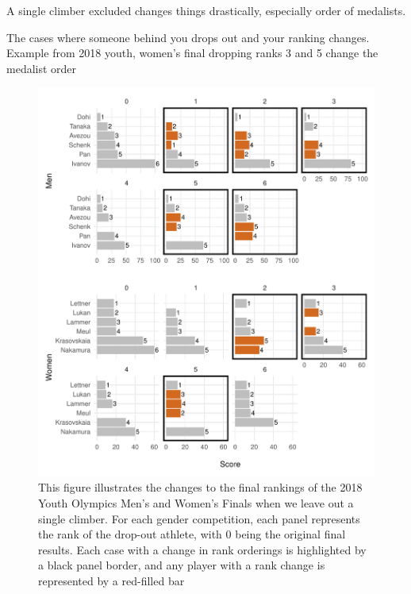 \documentclass[12pt]{article}
\begin{document}
A single climber excluded changes things drastically, especially order
of medalists.

The cases where someone behind you drops out and your ranking changes.
Example from 2018 youth, women's final dropping ranks 3 and 5 change the
medalist order

\begin{figure}[H]
\centering
\includegraphics{draft_files/figure-latex/unnamed-chunk-13-1.pdf}
\caption{This figure illustrates the changes to the final rankings of
the 2018 Youth Olympics Men's and Women's Finals when we leave out a
single climber. For each gender competition, each panel represents the
rank of the drop-out athlete, with 0 being the original final results.
Each case with a change in rank orderings is highlighted by a black
panel border, and any player with a rank change is represented by a
red-filled bar}
\end{figure}



\end{document}
